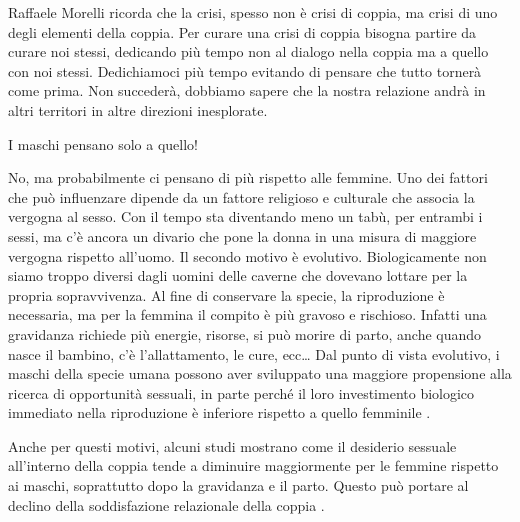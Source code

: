 \documentclass[12pt]{book} %
\begin{document}
Raffaele Morelli ricorda che la crisi, spesso non è crisi di coppia, ma crisi di uno degli elementi della coppia. Per curare
una crisi di coppia bisogna partire da curare noi stessi, dedicando più tempo non al dialogo nella coppia ma a quello
con noi stessi. Dedichiamoci più tempo evitando di pensare che tutto tornerà come prima. Non succederà, dobbiamo sapere
che la nostra relazione andrà in altri territori in altre direzioni inesplorate.

\begin{mdframed}[linewidth=1pt]
I maschi pensano solo a quello!

No, ma probabilmente ci pensano di più rispetto alle femmine. Uno dei fattori che può influenzare dipende da un
fattore religioso e culturale che associa la vergogna al sesso. Con il tempo sta diventando meno un tabù, per entrambi i sessi, ma c'è ancora un divario che pone la donna in una misura di maggiore vergogna rispetto all'uomo. Il secondo motivo è evolutivo. Biologicamente
non siamo troppo diversi dagli uomini delle caverne che dovevano lottare per la propria sopravvivenza. Al fine di
conservare la specie, la riproduzione è necessaria, ma per la femmina il compito è più gravoso e rischioso. Infatti una gravidanza richiede più energie, risorse, si può morire di parto, anche quando nasce il
bambino, c'è l'allattamento, le cure, ecc… Dal punto di vista evolutivo, i maschi della specie umana possono aver sviluppato una maggiore propensione alla ricerca di opportunità sessuali, in parte perché il loro investimento biologico immediato nella riproduzione è inferiore rispetto a quello femminile
.

Anche per questi motivi, alcuni studi mostrano come il desiderio sessuale all'interno della coppia tende a diminuire
maggiormente per le femmine rispetto ai maschi, soprattutto dopo la gravidanza e il parto. Questo può portare al
declino della soddisfazione relazionale della coppia
.
\end{mdframed}
\end{document}
